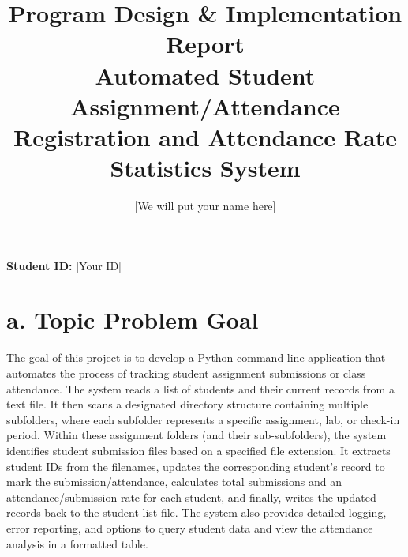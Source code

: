\documentclass[11pt, a4paper]{article}
\title{Program Design \& Implementation Report \\ \large 
\vspace{0.5cm}
Automated Student Assignment/Attendance Registration and Attendance Rate Statistics System}
\author{[We will put your name here]}
\date{}
\begin{document}
\maketitle
\noindent\textbf{Student ID:} [Your ID]
\vspace{1cm}

\section*{a. Topic Problem Goal}
The goal of this project is to develop a Python command-line application that automates the process of tracking student assignment submissions or class attendance. The system reads a list of students and their current records from a text file. It then scans a designated directory structure containing multiple subfolders, where each subfolder represents a specific assignment, lab, or check-in period. Within these assignment folders (and their sub-subfolders), the system identifies student submission files based on a specified file extension. It extracts student IDs from the filenames, updates the corresponding student's record to mark the submission/attendance, calculates total submissions and an attendance/submission rate for each student, and finally, writes the updated records back to the student list file. The system also provides detailed logging, error reporting, and options to query student data and view the attendance analysis in a formatted table.
\end{document}
